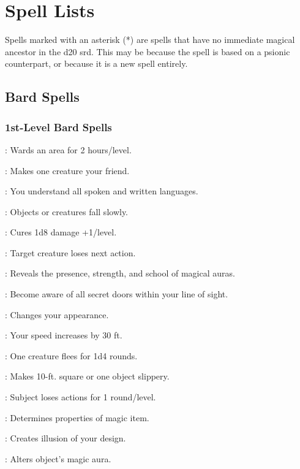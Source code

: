 \section{Spell Lists}
\label{sec:Spells}
Spells marked with an asterisk (*) are spells that have no immediate magical ancestor in the d20 srd.
This may be because the spell is based on a psionic counterpart, or because it is a new spell entirely.
\subsection{Bard Spells}
\label{sec:BardSpells}
\subsubsection{1st-Level Bard Spells}
\begin{list}{}{\leftmargin=1em}
\item {}: Wards an area for 2 hours/level.
\item {}: Makes one creature your friend.
\item {}: You understand all spoken and written languages.
\item {}: Objects or creatures fall slowly.
\item {}: Cures 1d8 damage +1/level.
\item {}: Target creature loses next action.
\item {}: Reveals the presence, strength, and school of magical auras.
\item {}: Become aware of all secret doors within your line of sight.
\item {}: Changes your appearance.
\item {}: Your speed increases by 30 ft.
\item {}: One creature flees for 1d4 rounds.
\item {}: Makes 10-ft. square or one object slippery.
\item {}: Subject loses actions for 1 round/level.
\item {}: Determines properties of magic item.
\item {}: Creates illusion of your design.
\item {}: Alters object's magic aura.

\end{list}
